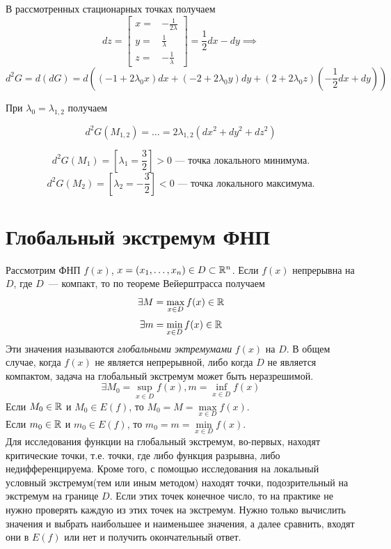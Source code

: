 \documentclass[../../main.tex]{subfiles}
\begin{document}
\begin{exmp}
	В рассмотренных стационарных точках получаем
	\[ dz = \left[
	\begin{array}{rl}
	x =& -\frac{1}{2\lambda} \\
	y =& \frac{1}{\lambda} \\
	z =& -\frac{1}{\lambda}
	\end{array}
	\right] = \frac{1}{2}dx - dy \implies\] 
	\[d^2G = d\left(dG\right) = 
	d\left(\left(-1 + 2\lambda_0x\right)dx + \left(-2 
	+ 2\lambda_0y\right)dy 
	+ \left(2 + 2\lambda_0z\right)\left(-\frac{1}{2}dx + dy\right)\right) \]
	
	При $\lambda_0 = \lambda_{1, 2}$ получаем
	
	\[d^2G(M_{1, 2}) = \dots = 2\lambda_{1, 2}(dx^2 + dy^2 + dz^2)\]
	
	\[d^2G(M_1) = \left[\lambda_1 = \frac{3}{2}\right] > 0
	\text{~--- точка локального минимума.}\]
	\[d^2G(M_2) = \left[\lambda_2 = -\frac{3}{2}\right] < 0
	\text{~--- точка локального максимума.}\]
	
	\section{Глобальный экстремум ФНП}
	
	Рассмотрим ФНП $f(x)$, $x = (x_1, \dots, 
	x_n) \in D \subset \mathbb{R}^n$. Если $f(x)$ непрерывна на $D$,
	где $D$~--- компакт, то по теореме Вейерштрасса получаем
	\[ \exists M = \max\limits_{x \in D} f(x) \in \mathbb{R} \] 
	\[ \exists m = \min\limits_{x \in D} f(x) \in \mathbb{R} \]
	Эти значения называются \emph{глобальными эктремумами} $f(x)$ на $D$.
	В общем случае, когда $f(x)$ не является непрерывной, либо когда $D$ 
	не является компактом, задача на глобальный экстремум может быть неразрешимой.
	\[ \exists M_0 = \sup\limits_{x \in D} f(x),
	m = \inf\limits_{x \in D} f(x) \]
	Если $M_0 \in \mathbb{R}$ и $M_0 \in E(f)$, то $M_0 = M = 
	\max\limits_{x \in D} f(x)$. \\
	Если $m_0 \in \mathbb{R}$ и $m_0 \in E(f)$, то $m_0 = m = 
	\min\limits_{x \in D} f(x)$. \\
	Для исследования функции на глобальный экстремум, во-первых, 
	находят критические точки, т.е. точки, 
	где либо функция разрывна, либо недифференцируема. Кроме того, с помощью 
	исследования на локальный условный экстремум(тем или иным методом)
	находят точки, подозрительный на экстремум на границе $D$.
	Если этих точек конечное число, то на практике не нужно проверять каждую из 
	этих точек на экстремум.
	Нужно только вычислить значения и выбрать наибольшее и наименьшее значения, 
	а далее сравнить, входят они в $E(f)$ или нет и 
	получить окончательный ответ.
	\end{exmp}
	
\end{document}

